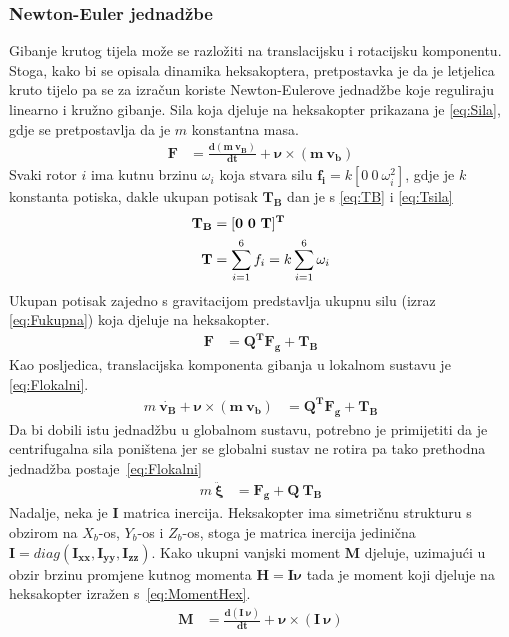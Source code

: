 \documentclass[times, utf8, diplomski]{fer}
\begin{document}
\subsubsection{Newton-Euler jednadžbe}
Gibanje krutog tijela može se razložiti na translacijsku i rotacijsku komponentu. Stoga, kako bi se opisala dinamika heksakoptera, pretpostavka je da je letjelica kruto tijelo pa se za izračun koriste Newton-Eulerove jednadžbe koje reguliraju linearno i kružno gibanje. Sila koja djeluje na heksakopter prikazana je \ref{eq:Sila}, gdje se pretpostavlja da je $m$ konstantna masa.
\begin{align}
\mathbf{F}&=\mathbf{\frac{d(m~v_B)}{dt}+\nu\times (m~v_b)} \label{eq:Sila}
\end{align}
Svaki rotor $i$ ima kutnu brzinu $\omega_i$ koja stvara silu $\mathbf{f_i}=k[0 ~0 ~\omega^2_i]$, gdje je $k$ konstanta potiska, dakle ukupan potisak  $\mathbf{T_B}$ dan je s \ref{eq:TB} i \ref{eq:Tsila}
\begin{align}
\centering
\mathbf{T_B}&=\mathbf{[0 ~0 ~T]^T} \label{eq:TB} \\
\mathbf{T}&=\sum_{i=1}^{6}f_i=k\sum_{i=1}^{6}\omega_i \label{eq:Tsila}
\end{align}
Ukupan potisak zajedno s gravitacijom predstavlja ukupnu silu (izraz \ref{eq:Fukupna}) koja djeluje na heksakopter.
\begin{align}
\mathbf{F}&=\mathbf{Q^TF_g+T_B} \label{eq:Fukupna}
\end{align}
Kao posljedica, translacijska komponenta gibanja u lokalnom sustavu je \ref{eq:Flokalni}.
\begin{align}
m~\mathbf{\dot{v_B}+\nu\times (m~v_b)}&=\mathbf{Q^TF_g+T_B} \label{eq:Flokalni}
\end{align}
Da bi dobili istu jednadžbu u globalnom sustavu, potrebno je primijetiti da je centrifugalna sila poništena jer se globalni sustav ne rotira pa tako prethodna jednadžba postaje~\ref{eq:Flokalni}
\begin{align}
m~\mathbf{\ddot{\xi}}&=\mathbf{F_g+Q~T_B} \label{eq:Flokalni}
\end{align}
Nadalje, neka je $\mathbf{I}$ matrica inercija. Heksakopter ima simetričnu strukturu s obzirom na $X_b$-os, $Y_b$-os i $Z_b$-os, stoga je matrica inercija jedinična $\mathbf{I}=diag(\mathbf{I_{xx}, I_{yy}, I_{zz}})$. Kako ukupni vanjski moment $\mathbf{M}$ djeluje, uzimajući u obzir brzinu promjene kutnog momenta  $\mathbf{H=I\nu}$ tada je moment koji djeluje na heksakopter izražen s~\ref{eq:MomentHex}.
\begin{align}
\mathbf{M}&=\mathbf{\frac{d(I~\nu)}{dt}+\nu\times(I~\nu)} \label{eq:MomentHex}
\end{align}
\end{document}
